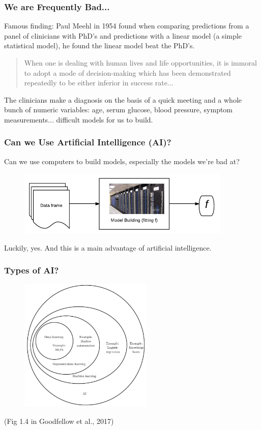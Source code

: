 \documentclass[handout]{beamer}
\begin{document}
\begin{frame}\frametitle{We are Frequently Bad...}

Famous finding: Paul Meehl in 1954 found when comparing predictions from a panel of clinicians with PhD's and predictions with a linear model (a simple statistical model), he found the linear model beat the PhD's.


\begin{quotation}\footnotesize
When one is dealing with human lives and life opportunities, it is immoral to adopt a mode of decision-making which has been demonstrated repeatedly to be either inferior in success rate...
\end{quotation}

The clinicians make a diagnosis on the basis of a quick meeting and a whole bunch of numeric variables: age, serum glucose, blood pressure, symptom measurements... difficult models for us to build.

\end{frame}


\begin{frame}\frametitle{Can we Use Artificial Intelligence (AI)?}

Can we use computers to build models, especially the models we're bad at? 

\begin{figure}
\centering
\includegraphics[width=4in]{machine_learning}
\end{figure}
	
Luckily, yes. And this is a main advantage of artificial intelligence.

\end{frame}

\begin{frame}\frametitle{Types of AI?}

\begin{figure}
\centering
\includegraphics[width=2.5in]{fig14.jpg}
\end{figure}

(Fig 1.4 in Goodfellow et al., 2017)

\end{frame}
\end{document}
